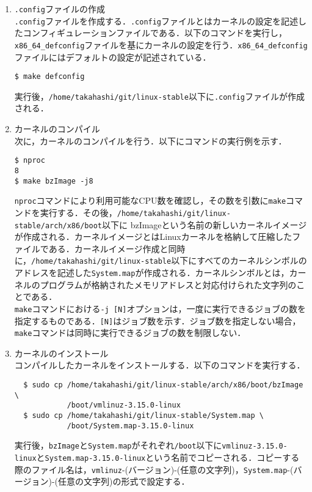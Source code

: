 \documentclass[12pt]{jsarticle}
\begin{document}
\begin{enumerate}
\item \verb|.config|ファイルの作成 \\
\verb|.config|ファイルを作成する．\verb|.config|ファイルとはカーネルの設定を記述したコンフィギュレーションファイルである．以下のコマンドを実行し，\verb|x86_64_defconfig|ファイルを基にカーネルの設定を行う．\verb|x86_64_defconfig|ファイルにはデフォルトの設定が記述されている．

\begin{verbatim}
$ make defconfig
\end{verbatim}
実行後，\verb|/home/takahashi/git/linux-stable|以下に\verb|.config|ファイルが作成される．

\item カーネルのコンパイル \\
次に，カーネルのコンパイルを行う．以下にコマンドの実行例を示す．

\newpage
\begin{verbatim}
$ nproc
8
$ make bzImage -j8
\end{verbatim}
\verb|nproc|コマンドにより利用可能なCPU数を確認し，その数を引数に\verb|make|コマンドを実行する．その後，\verb|/home/takahashi/git/linux-stable/arch/x86/boot|以下に
bzImageという名前の新しいカーネルイメージが作成される．カーネルイメージとはLinuxカーネルを格納して圧縮したファイルである．カーネルイメージ作成と同時に，\verb|/home/takahashi/git/linux-stable|以下にすべてのカーネルシンボルのアドレスを記述した\verb|System.map|が作成される．カーネルシンボルとは，カーネルのプログラムが格納されたメモリアドレスと対応付けられた文字列のことである．\\
\verb|make|コマンドにおける\verb|-j [N]|オプションは，一度に実行できるジョブの数を指定するものである．\verb|[N]|はジョブ数を示す．ジョブ数を指定しない場合，\verb|make|コマンドは同時に実行できるジョブの数を制限しない．

\item カーネルのインストール \\
  コンパイルしたカーネルをインストールする．以下のコマンドを実行する．
\begin{verbatim}
  $ sudo cp /home/takahashi/git/linux-stable/arch/x86/boot/bzImage \
            /boot/vmlinuz-3.15.0-linux
  $ sudo cp /home/takahashi/git/linux-stable/System.map \
            /boot/System.map-3.15.0-linux
\end{verbatim}
実行後，\verb|bzImage|と\verb|System.map|がそれぞれ\verb|/boot|以下に\verb|vmlinuz-3.15.0-linux|と\verb|System.map-3.15.0-linux|という名前でコピーされる．コピーする際のファイル名は，\verb|vmlinuz|-(バージョン)-(任意の文字列)，\verb|System.map|-(バージョン)-(任意の文字列)の形式で設定する．


\end{enumerate}
\end{document}
